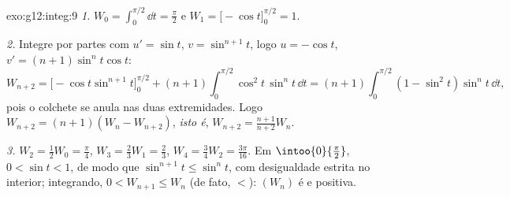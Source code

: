 \begin{solution}{exo:g12:integ:9}
\emph{1.} $W_0 = \int_0^{\pi/2} \dd t = \frac{\pi}{2}$ e
$W_1 = \bigl[-\cos t\bigr]_0^{\pi/2} = 1$.

\emph{2.} Integre por partes com $u' = \sin t$, $v = \sin^{n+1} t$, logo
$u = -\cos t$, $v' = (n+1)\sin^n t \cos t$:
\[
W_{n+2} = \bigl[-\cos t \sin^{n+1} t\bigr]_0^{\pi/2}
+ (n+1)\int_0^{\pi/2} \cos^2 t\,\sin^n t\,\dd t
= (n+1)\int_0^{\pi/2} (1 - \sin^2 t)\sin^n t\,\dd t,
\]
pois o colchete se anula nas duas extremidades. Logo
$W_{n+2} = (n+1)(W_n - W_{n+2})$, \emph{isto é},
$W_{n+2} = \frac{n+1}{n+2} W_n$.

\emph{3.} $W_2 = \frac12 W_0 = \frac{\pi}{4}$,
$W_3 = \frac23 W_1 = \frac23$,
$W_4 = \frac34 W_2 = \frac{3\pi}{16}$. Em
$\intoo{0}{\frac\pi2}$, $0 < \sin t < 1$, de modo que
$\sin^{n+1} t \leq \sin^n t$, com desigualdade estrita no interior;
integrando, $0 < W_{n+1} \leq W_n$ (de fato, $<$): $(W_n)$ é  e
positiva.
\end{solution}

